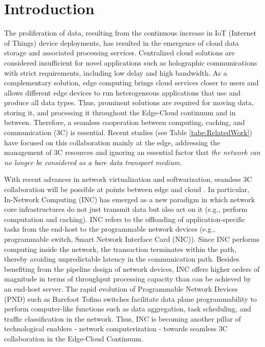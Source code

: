 \section{Introduction}

The proliferation of data, resulting from the continuous increase in IoT (Internet of Things) device deployments, has resulted in the emergence of cloud data storage and associated processing services. Centralized cloud solutions are considered insufficient for novel applications such as holographic communications with strict requirements, including low delay and high bandwidth. As a complementary solution, edge computing brings cloud services closer to users and allows different edge devices to run heterogeneous applications that use and produce all data types. Thus, prominent solutions are required for moving data, storing it, and processing it throughout the Edge-Cloud continuum and in between. Therefore, a seamless cooperation between computing, caching, and communication (3C) is essential. Recent studies (see Table \ref{tabe:RelatedWork}) have focused on this collaboration mainly at the edge, addressing the management of 3C resources and ignoring an essential factor that \textit{the network can no longer be considered as a bare data transport medium.} 

With recent advances in network virtualization and softwarization, seamless 3C collaboration will be possible at points between edge and cloud \cite{zeng2021guest}. In particular, In-Network Computing (INC) has emerged as a new paradigm in which network core infrastructures do not just transmit data but also act on it (e.g., perform computation and caching). 
INC refers to the offloading of application-specific tasks from the end-host to the programmable network devices (e.g., programmable switch, Smart Network Interface Card (NIC)). Since INC performs computing inside the network, the transaction terminates within the path, thereby avoiding unpredictable latency in the communication path. Besides benefiting from the pipeline design of network devices, INC offers higher orders of magnitude in terms of throughput processing capacity than can be achieved by an end-host server.
The rapid evolution of Programmable Network Devices (PND) such as Barefoot Tofino switches \cite {Tofino} facilitate data plane programmability to perform computer-like functions such as data aggregation, task scheduling, and traffic classification in the network.
Thus, INC is becoming another pillar of technological enablers - network computerization - towards seamless 3C collaboration in the Edge-Cloud Continuum.



